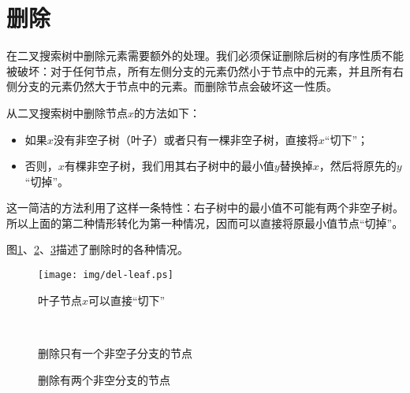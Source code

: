 \documentclass[b5paper]{ctexart}
\begin{document}
\section{删除}
在二叉搜索树中删除元素需要额外的处理。我们必须保证删除后树的有序性质不能被破坏：对于任何节点，所有左侧分支的元素仍然小于节点中的元素，并且所有右侧分支的元素仍然大于节点中的元素。而删除节点会破坏这一性质。

从二叉搜索树中删除节点$x$的方法如下\cite{sgi-stl}：
\begin{itemize}
\item 如果$x$没有非空子树（叶子）或者只有一棵非空子树，直接将$x$“切下”；
\item 否则，$x$有棵非空子树，我们用其右子树中的最小值$y$替换掉$x$，然后将原先的$y$“切掉”。
\end{itemize}

这一简洁的方法利用了这样一条特性：右子树中的最小值不可能有两个非空子树。所以上面的第二种情形转化为第一种情况，因而可以直接将原最小值节点“切掉”。

图\ref{fig:del-leaf}、\ref{fig:del-1child}、\ref{fig:del-branch}描述了删除时的各种情况。

\begin{figure}[htbp]
  \centering
  \texttt{[image: img/del-leaf.ps]}
  \caption{叶子节点$x$可以直接“切下”} \label{fig:del-leaf}
\end{figure}

\begin{figure}[htbp]
  \centering
   \\
  \caption{删除只有一个非空子分支的节点}
  \label{fig:del-1child}
\end{figure}

\begin{figure}[htbp]
  \centering
  \caption{删除有两个非空分支的节点}
  \label{fig:del-branch}
\end{figure}
\end{document}
